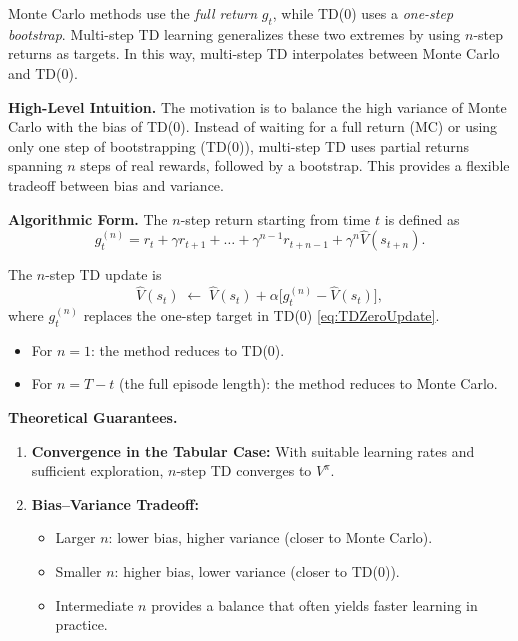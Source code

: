 \documentclass[
]{book}
\theoremstyle{definition}
\theoremstyle{definition}
\theoremstyle{definition}
\theoremstyle{definition}
\theoremstyle{remark}
\begin{document}
Monte Carlo methods use the \emph{full return} \(g_t\), while TD(0) uses a \emph{one-step bootstrap}. Multi-step TD learning generalizes these two extremes by using \(n\)-step returns as targets. In this way, multi-step TD interpolates between Monte Carlo and TD(0).

\textbf{High-Level Intuition.} The motivation is to balance the high variance of Monte Carlo with the bias of TD(0). Instead of waiting for a full return (MC) or using only one step of bootstrapping (TD(0)), multi-step TD uses partial returns spanning \(n\) steps of real rewards, followed by a bootstrap. This provides a flexible tradeoff between bias and variance.

\textbf{Algorithmic Form.} The \(n\)-step return starting from time \(t\) is defined as
\begin{equation}
g_t^{(n)} = r_t + \gamma r_{t+1} + \dots + \gamma^{n-1} r_{t+n-1} + \gamma^n \hat{V}(s_{t+n}).
\label{eq:nStepReturn}
\end{equation}

The \(n\)-step TD update is
\begin{equation}
\hat{V}(s_t) \;\leftarrow\; \hat{V}(s_t) + \alpha \big[ g_t^{(n)} - \hat{V}(s_t) \big],
\label{eq:nStepTDUpdate}
\end{equation}
where \(g_t^{(n)}\) replaces the one-step target in TD(0) \eqref{eq:TDZeroUpdate}.

\begin{itemize}
\item
  For \(n=1\): the method reduces to TD(0).
\item
  For \(n=T-t\) (the full episode length): the method reduces to Monte Carlo.
\end{itemize}

\textbf{Theoretical Guarantees.}

\begin{enumerate}
\def\labelenumi{\arabic{enumi}.}
\item
  \textbf{Convergence in the Tabular Case:} With suitable learning rates and sufficient exploration, \(n\)-step TD converges to \(V^\pi\).
\item
  \textbf{Bias--Variance Tradeoff:}

  \begin{itemize}
  \item
    Larger \(n\): lower bias, higher variance (closer to Monte Carlo).
  \item
    Smaller \(n\): higher bias, lower variance (closer to TD(0)).
  \item
    Intermediate \(n\) provides a balance that often yields faster learning in practice.
  \end{itemize}
\end{enumerate}
\end{document}
